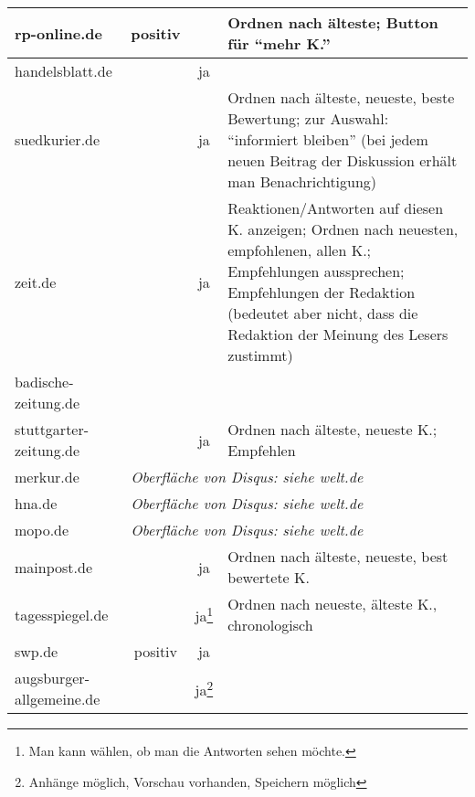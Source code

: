 \begin{landscape}
\begin{longtable}{lccp{100mm}}
rp-online.de
& positiv
&
& Ordnen nach älteste; Button für ``mehr K.''
\\\midrule

handelsblatt.de
&
& ja
&
\\\midrule

suedkurier.de
&
& ja
& Ordnen nach älteste, neueste, beste Bewertung; zur Auswahl: ``informiert
  bleiben'' (bei jedem neuen Beitrag der Diskussion erhält man
  Benachrichtigung)
\\\midrule

zeit.de
&
& ja

& Reaktionen/Antworten auf diesen K. anzeigen; Ordnen nach neuesten,
  empfohlenen, allen K.; Empfehlungen aussprechen; Empfehlungen der Redaktion
  (bedeutet aber nicht, dass die Redaktion der Meinung des Lesers
  zustimmt)
\\\midrule

badische-zeitung.de
&
&
&
\\\midrule

stuttgarter-zeitung.de
&
& ja
& Ordnen nach älteste, neueste K.; Empfehlen
\\\midrule

merkur.de & \multicolumn{3}{l}{\hspace{2cm}\em Oberfläche von Disqus: siehe welt.de}
\\\midrule

hna.de & \multicolumn{3}{l}{\hspace{2cm}\em Oberfläche von Disqus: siehe welt.de}
\\\midrule

mopo.de & \multicolumn{3}{l}{\hspace{2cm}\em Oberfläche von Disqus: siehe welt.de}
\\\midrule

mainpost.de
&
& ja
& Ordnen nach älteste, neueste, best bewertete K.
\\\midrule

tagesspiegel.de
&
& ja\footnote{Man kann wählen, ob man die Antworten sehen möchte.}
& Ordnen nach neueste, älteste K., chronologisch
\\\midrule

swp.de
& positiv
& ja
&
\\\midrule

augsburger-allgemeine.de
&
& ja\footnote{Anhänge möglich, Vorschau vorhanden, Speichern möglich}
&

\end{longtable}
\end{landscape}

